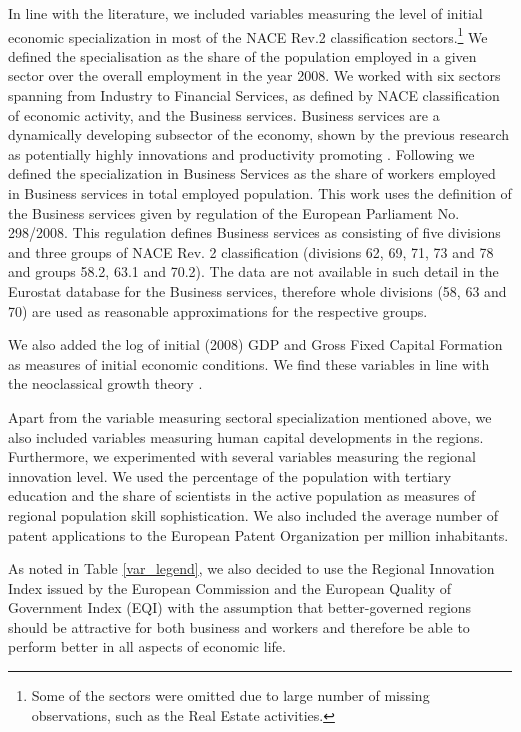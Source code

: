 \documentclass[11pt]{article}
\begin{document}
In line with the literature, we included variables measuring the level of initial economic specialization in most of the NACE Rev.2 classification sectors.\footnote{Some of the sectors were omitted due to large number of missing observations, such as the Real Estate activities.} We defined the specialisation as the share of the population employed in a given sector over the overall employment in the year 2008. We worked with six sectors spanning from Industry to Financial Services, as defined by NACE classification of economic activity, and the Business services. Business services are a dynamically developing subsector of the economy, shown by the previous research as potentially highly innovations and productivity promoting \citep{corrocher2014kibs}. Following \citet{guastella2015knowledge} we defined the specialization in Business Services as the share of workers employed in Business services in total employed population. This work uses the definition of the Business services given by regulation of the European Parliament No. 298/2008. This regulation defines Business services as consisting of five divisions and three groups of NACE Rev. 2 classification (divisions 62, 69, 71, 73 and 78 and groups 58.2, 63.1 and 70.2). The data are not available in such detail in the Eurostat database for the Business services, therefore whole divisions (58, 63 and 70) are used as reasonable approximations for the respective groups.

We also added the log of initial (2008) GDP and Gross Fixed Capital Formation as measures of initial economic conditions. We find these variables in line with the neoclassical growth theory \cite{iammarino2017regional}.%

Apart from the variable measuring sectoral specialization mentioned above, we also included variables measuring human capital developments in the regions. Furthermore, we experimented with several variables measuring the regional innovation level. We used the percentage of the population with tertiary education and the share of scientists in the active population as measures of regional population skill sophistication. We also included the average number of patent applications to the European Patent Organization per million inhabitants. 

As noted in Table \ref{var_legend}, we also decided to use the Regional Innovation Index issued by the European Commission and the European Quality of Government Index (EQI) with the assumption that better-governed regions should be attractive for both business and workers and therefore be able to perform better in all aspects of economic life.
\end{document}
